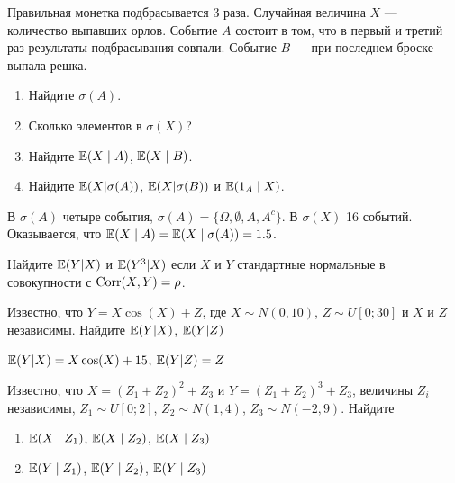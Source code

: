 \begin{problem}
 Правильная монетка подбрасывается 3 раза. Случайная величина $X$ — количество выпавших орлов. Событие $A$ состоит в том, что в первый и третий раз результаты подбрасывания совпали. Событие $B$ — при последнем броске выпала решка.
\begin{enumerate}
\item Найдите $\sigma(A)$.
\item Сколько элементов в $\sigma(X)$?
\item Найдите $\mathbb{E}(X\mid A)$, $\mathbb{E}(X\mid B)$.
\item Найдите $\mathbb{E}(X|\sigma(A))$, $\mathbb{E}(X|\sigma(B))$ и $\mathbb{E}(1_A \mid X)$.
\end{enumerate}

\begin{sol}
В $\sigma(A)$ четыре события, $\sigma(A)=\{\Omega, \emptyset, A, A^c\}$. В $\sigma(X)$ 16 событий. Оказывается, что $\mathbb{E}(X\mid A)=\mathbb{E}(X\mid \sigma(A))=1.5$.
\end{sol}
\end{problem}

\begin{problem}
Найдите $\mathbb{E}(Y|X)$ и $\mathbb{E}(Y^3|X)$ если $X$ и $Y$ стандартные нормальные в совокупности с $\operatorname{Corr}(X,Y)=\rho$.

\begin{sol}

\end{sol}
\end{problem}

\begin{problem}
Известно, что $Y=X\cos(X)+Z$, где $X\sim N(0,10)$, $Z\sim U[0;30]$ и $X$ и $Z$ независимы. Найдите $\mathbb{E}(Y|X)$, $\mathbb{E}(Y|Z)$

\begin{sol}
$\mathbb{E}(Y|X)=X\cos(X)+15$, $\mathbb{E}(Y|Z)=Z$
\end{sol}
\end{problem}

\begin{problem}
Известно, что $X=(Z_1+Z_2)^2+Z_3$ и $Y=(Z_1+Z_2)^3+Z_3$, величины $Z_i$ независимы, $Z_1\sim U[0;2]$, $Z_2\sim N(1,4)$, $Z_3\sim N(-2,9)$. Найдите
\begin{enumerate}
\item $\mathbb{E}(X \mid Z_1)$, $\mathbb{E}(X \mid Z_2)$, $\mathbb{E}(X \mid Z_3)$
\item $\mathbb{E}(Y \mid Z_1)$, $\mathbb{E}(Y \mid Z_2)$, $\mathbb{E}(Y \mid Z_3)$
\end{enumerate}


\begin{sol}
\end{sol}
\end{problem}

